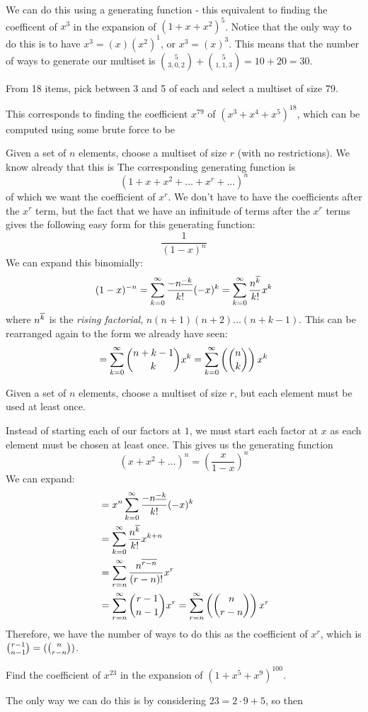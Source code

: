 \documentclass[11pt,twosided]{article}
\begin{document}
We can do this using a generating function - this equivalent to finding the coefficent of $x^3$ in the expansion of $(1+x+x^2)^5$. Notice that the only way to do this is to have $x^3 = (x)(x^2)^1$, or $x^3 = (x)^3$. This means that the number of ways to generate our multiset is $\binom{5}{3, 0, 2} + \binom{5}{1, 1, 3} = 10 + 20 = \boxed{30}$. 

\begin{problem}
	From 18 items, pick between 3 and 5 of each and select a multiset of size 79. 
\end{problem}
\begin{solution}
	This corresponds to finding the coefficient $x^79$ of $(x^3 + x^4 + x^5)^18$, which can be computed using some brute force to be %
\end{solution}	

Given a set of $n$ elements, choose a multiset of size $r$ (with no restrictions). We know already that this is The corresponding generating function is 
\[
	(1 + x + x^2 + \ldots + x^r + \ldots)^n
\]
of which we want the coefficient of $x^r$. We don't have to have the coefficients after the $x^r$ term, but the fact that we have an infinitude of terms after the $x^r$ terms gives the following easy form for this generating function: 
\[
	\frac{1}{(1-x)^n}
\]
We can expand this binomially: 
\[
	(1-x)^{-n} = \sum_{k=0}^\infty \frac{-n^{\underline{-k}}}{k!} (-x)^k = \sum_{k=0}^\infty \frac{n^{\overline{k}}}{k!} x^k  
\]	
where $n^{\overline{k}}$ is the \textit{rising factorial}, $n(n+1)(n+2) \ldots (n+k-1)$. This can be rearranged again to the form we already have seen: 
\[
	 = \sum_{k=0}^\infty \binom{n+k-1}{k} x^k  = \sum_{k=0}^\infty \left(\binom{n}{k}\right) x^k
\]	
\begin{problem}{3}
	Given a set of $n$ elements, choose a multiset of size $r$, but each element must be used at least once. 
\end{problem}

\begin{solution}
	Instead of starting each of our factors at $1$, we must start each factor at $x$ as each element must be chosen at least once. This gives us the generating function
\[
	(x + x^2 + \ldots )^n = \left(\frac{x}{1-x}\right)^n 
\]
We can expand: 
\begin{align*}
	&= x^n \sum_{k=0}^\infty \frac{-n^{\underline{-k}}}{k!} (-x)^k \\
	&= \sum_{k=0}^\infty \frac{n^{\overline{k}}}{k!} x^{k+n} \\
	&= \sum_{r=n}^\infty \frac{n^{\overline{r-n}}}{(r-n)!} x^{r}\\
	&= \sum_{r=n}^\infty \binom{r-1}{n-1} x^{r} = \sum_{r=n}^\infty \left(\binom{n}{r-n}\right) x^{r}
\end{align*}
Therefore, we have the number of ways to do this as the coefficient of $x^r$, which is $\binom{r-1}{n-1} = (\binom{n}{r-n})$. 
\end{solution}

\begin{problem}{4}
	Find the coefficient of $x^23$ in the expansion of $(1+x^5+x^9)^100$. 
\end{problem}
\begin{solution}
	The only way we can do this is by considering $23 = 2\cdot 9 + 5$, so then 

\end{solution}
\end{document}
